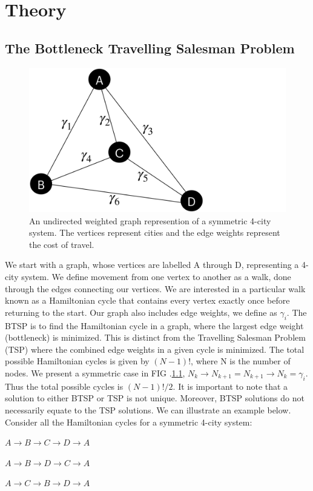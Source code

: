 \documentclass[msc,oneside]{ubcthesis}
\begin{document}
	\chapter{Theory}
	\section{The Bottleneck Travelling Salesman Problem}


\begin{figure}[!h]
	\centering
	\includegraphics[trim={0 0 21.9cm 0},clip, width=0.4 \linewidth]{"graphics/4-city"}
	\caption{An undirected weighted graph represention of a  symmetric 4-city system.  The vertices represent cities and the edge weights represent the cost of travel. }
	\label{fig:4-city-graphic}
\end{figure}		

We start with a graph, whose vertices are labelled A through D, representing a 4-city system. We define movement from one vertex to another as a walk, done through the edges connecting our vertices. We are interested in a particular walk known as a Hamiltonian cycle that contains every vertex exactly once before returning to the start. Our graph also includes edge weights, we define as $ \gamma_i $.
The BTSP is to find the Hamiltonian cycle in a graph, where the largest edge weight (bottleneck) is minimized. This is distinct from the Travelling Salesman Problem (TSP) where the combined edge weights in a given cycle is minimized. The total possible Hamiltonian cycles is given by $(N-1)!$, where N is the number of nodes. We present a symmetric case in FIG .\ref{fig:4-city-graphic},  $N_k \rightarrow N_{k+1} = N_{k+1} \rightarrow N_{k} = \gamma_i$. Thus the total possible cycles is  $(N-1)!/2$.  It is important to note that a solution to either BTSP or TSP is not unique. Moreover, BTSP solutions do not necessarily equate to the TSP solutions. We can illustrate an example below. Consider all the Hamiltonian cycles for a symmetric 4-city system:

\begin{center}
	$ A \rightarrow B \rightarrow C \rightarrow D \rightarrow A $
	
	$ A \rightarrow B \rightarrow D \rightarrow C \rightarrow A $ 
	
	$ A \rightarrow C \rightarrow B \rightarrow D \rightarrow A $
\end{center}
\end{document}
